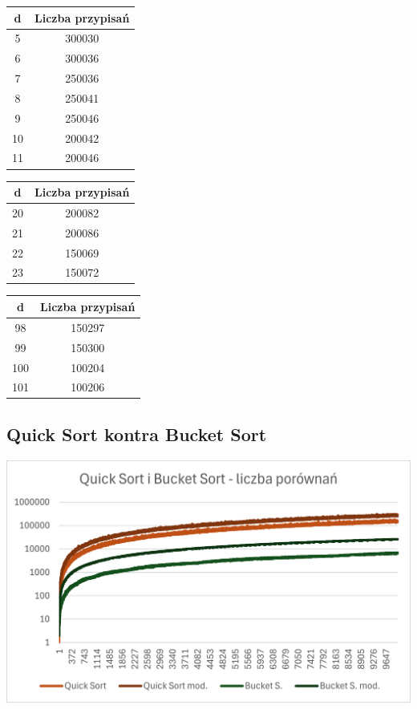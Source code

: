 \documentclass{article}
\begin{document}
\begin{center}
\begin{tabular}{|c|c|}
 \hline
 d & Liczba przypisań \\ 
 \hline
 5 & 300030 \\
 6 & 300036 \\
 7 & 250036 \\
 8 & 250041 \\
 9 & 250046 \\
 10 & 200042 \\
 11 & 200046 \\
 \hline
\end{tabular}

\vspace{0.5cm}

\begin{tabular}{|c|c|}
 \hline
 d & Liczba przypisań \\ 
 \hline
 20 & 200082 \\
 21 & 200086 \\
 22 & 150069 \\
 23 & 150072 \\
 \hline
\end{tabular}

\vspace{0.5cm}

\begin{tabular}{|c|c|}
 \hline
 d & Liczba przypisań \\ 
 \hline
 98 & 150297 \\
 99 & 150300 \\
 100 & 100204 \\
 101 & 100206 \\
 \hline
\end{tabular}
\end{center}

\subsection{Quick Sort kontra Bucket Sort}

\begin{center}
    \includegraphics[width=1\textwidth]{QuickBucketPor.png}
\end{center}
\end{document}
